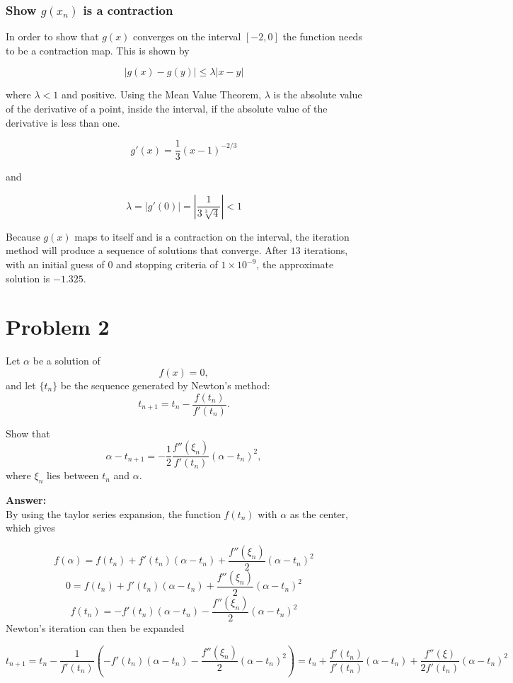 \documentclass[11pt]{article}
\begin{document}
\subsubsection*{Show $g(x_n)$ is a contraction}
In order to show that $g(x)$ converges on the interval $[-2, 0]$ the function needs to be a contraction map.
This is shown by

$$|g(x) - g(y)| \leq \lambda |x - y|$$

\noindent where $\lambda < 1$ and positive. Using the Mean Value Theorem, $\lambda$ is the 
absolute value of the derivative of a point, inside the interval, if the absolute value of the derivative is
less than one.

$$g'(x) = \frac{1}{3}(x-1)^{-2/3}$$

\noindent and

$$\lambda = |g'(0)| = |\frac{1}{3\sqrt[3]{4}}| < 1$$

\noindent Because $g(x)$ maps to itself and is a contraction on the interval, the iteration method will
produce a sequence of solutions that converge. After $13$ iterations, with an initial guess of $0$ and stopping criteria of $1\times 10^{-9}$, the approximate solution is $-1.325$.


\section*{Problem 2}

Let \(\alpha\) be a solution of
\[
f(x)=0,
\]
and let \(\{t_n\}\) be the sequence generated by Newton's method:
\[
t_{n+1}=t_n-\frac{f(t_n)}{f'(t_n)}.
\]

\noindent Show that
\[
\alpha-t_{n+1}
=
-\frac{1}{2}\frac{f''(\xi_n)}{f'(t_n)}
(\alpha-t_n)^2,
\]
where \(\xi_n\) lies between \(t_n\) and \(\alpha\).

\bigskip

\noindent\textbf{Answer:}\\

\noindent By using the taylor series expansion, the function 
$f(t_n)$ with $\alpha$ as the center, which gives

\[ f(\alpha) = f(t_n) + f'(t_n)(\alpha-t_n) + \frac{f''(\xi_n)}{2}(\alpha-t_n)^2 \]
\[ 0 = f(t_n) + f'(t_n)(\alpha-t_n) + \frac{f''(\xi_n)}{2}(\alpha-t_n)^2 \]
\[ f(t_n) = -f'(t_n)(\alpha-t_n) - \frac{f''(\xi_n)}{2}(\alpha-t_n)^2 \]
\noindent Newton's iteration can then be expanded

\[ 
  t_{n+1} = t_n - \frac{1}{f'(t_n)}(-f'(t_n)(\alpha-t_n) - \frac{f''(\xi_n)}{2}(\alpha-t_n)^2)
  =t_n + \frac{f'(t_n)}{f'(t_n)}(\alpha - t_n) + \frac{f''(\xi)}{2f'(t_n)}(\alpha - t_n)^2
\]
\end{document}
